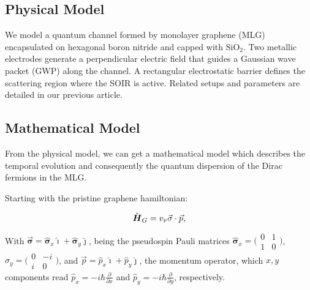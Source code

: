 \subsection{Physical Model}\label{subsec:physical-model}

We model a quantum channel formed by monolayer graphene (MLG) encapsulated on hexagonal boron nitride and capped with SiO$_2$.
Two metallic electrodes generate a perpendicular electric field that guides a Gaussian wave packet (GWP) along the channel.
A rectangular electrostatic barrier defines the scattering region where the SOIR is active.
Related setups and parameters are detailed in our previous article\cite{Serna2019}.

\subsection{Mathematical Model}\label{subsec:mathematical-model}

From the physical model, we can get a mathematical model which describes the temporal evolution and consequently the quantum dispersion of the Dirac fermions in the MLG\@.

Starting with the pristine graphene hamiltonian\cite{Geimk2007}:

\begin{equation}
    \label{eq:pristGr}
    \hat{\mbox{\boldmath $H$}}_G = v_{\mbox{\tiny F}}\vec{\mathbf{\sigma}}\cdot\vec{p},
\end{equation}

\noindent With $\vec{\mathbf{\sigma}} = \hat{\mathbf{\sigma}}_{x}\hat{\imath} + \hat{\mathbf{\sigma}}_{y}\hat{\jmath}$, being the pseudospin Pauli matrices $\hat{\mathbf{\sigma}}_{x} = \bigl(\begin{smallmatrix}
                                                                                                                                                                                                   0&1 \\ 1&0
\end{smallmatrix} \bigr)$, $\hat{\sigma}_{y} = \bigl(\begin{smallmatrix}
                                                         0&-i \\ i&0
\end{smallmatrix} \bigr)$, and $\vec{p}=\hat{p}_{x}\hat{\imath}+\hat{p}_{y}\hat{\jmath}$, the momentum operator, which $x, y$ components read $\hat{p}_{x} = -i\hbar\frac{\partial}{\partial x}$ and $\hat{p}_{y} = -i\hbar\frac{\partial}{\partial y}$, respectively.


